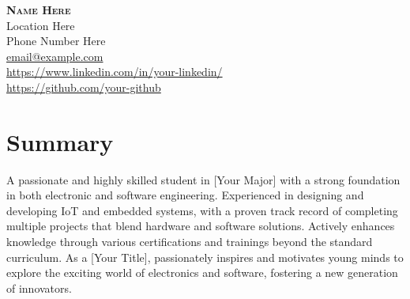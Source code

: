 \documentclass[A4,11pt]{article}
\begin{document}
		
		
		\begin{minipage}[c]{0.2\textwidth}
			\hfill\vline\hfill
		\end{minipage}
		\begin{minipage}[c]{0.6\textwidth}
			\textbf{\Huge \scshape{Name Here}}
			\vspace{10pt} \\
			\small{Location Here}\\ 
			\small{Phone Number Here} \\
			\href{mailto:email@example.com}{email@example.com}\\
			\href{https://www.linkedin.com/in/your-linkedin/}{https://www.linkedin.com/in/your-linkedin/} \\
			\href{https://github.com/your-github}{https://github.com/your-github}
		\end{minipage}
		
		\section{Summary}
		\vspace{-5pt}
		\begin{justify}
			\begin{itemize}[leftmargin=0.5cm, label={}]
				{A passionate and highly skilled student in [Your Major] with a strong foundation in both electronic and software engineering. Experienced in designing and developing IoT and embedded systems, with a proven track record of completing multiple projects that blend hardware and software solutions. Actively enhances knowledge through various certifications and trainings beyond the standard curriculum. As a [Your Title], passionately inspires and motivates young minds to explore the exciting world of electronics and software, fostering a new generation of innovators.}
			\end{itemize}
		\end{justify}
		\vspace{-20pt}
		
\end{document}
